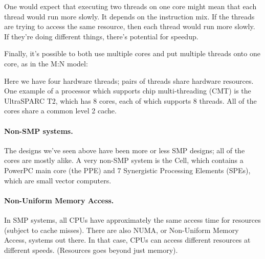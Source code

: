 \documentclass[a4paper]{report}
\begin{document}
One would expect that executing two threads on one core might
mean that each thread would run more slowly. It depends on the instruction
mix. If the threads are trying to access the same resource, then each
thread would run more slowly. If they're doing different things, there's 
potential for speedup.

Finally, it's possible to both use multiple cores and put multiple threads
onto one core, as in the M:N model:

\begin{center}
\end{center}
Here we have four hardware threads; pairs of threads share hardware
resources. One example of a processor which supports chip multi-threading
(CMT) is the UltraSPARC T2, which has 8 cores, each of which supports 8 
threads. All of the cores share a common level 2 cache.

\paragraph{Non-SMP systems.} The designs we've seen above have been
more or less SMP designs; all of the cores are mostly alike.
A very non-SMP system is the Cell, which contains a PowerPC main core
(the PPE) and 7 Synergistic Processing Elements (SPEs), which are
small vector computers.


\paragraph{Non-Uniform Memory Access.}
In SMP systems, all CPUs have approximately the same access time for resources
(subject to cache misses). There are also NUMA, or Non-Uniform Memory Access,
systems out there. In that case, CPUs can access different resources at different
speeds. (Resources goes beyond just memory).
\end{document}
